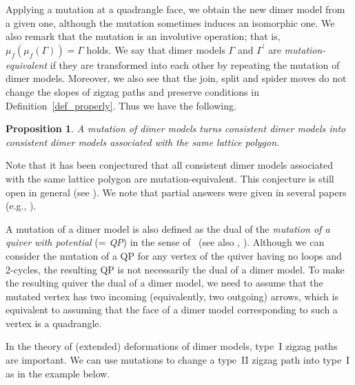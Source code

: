 \documentclass[pdftex]{sigma}%
\numberwithin{equation}{section}
\numberwithin{figure}{section}
\numberwithin{table}{section}
\newtheorem{Proposition}[Theorem]{Proposition}
 { \theoremstyle{definition}
\newtheorem{Definition}[Theorem]{Definition}
\newtheorem{Note}[Theorem]{Note}
\newtheorem{Example}[Theorem]{Example}
\newtheorem{Remark}[Theorem]{Remark}
\newtheorem{observation}[Theorem]{Observation}
\newtheorem{operation}[Theorem]{Operation}
\newtheorem{setting}[Theorem]{Setting}}
\begin{document}
Applying a mutation at a quadrangle face, we obtain the new dimer model from a given one, although the mutation sometimes induces an isomorphic one.
We also remark that the mutation is an involutive operation; that is, $\mu_f(\mu_f(\Gamma))=\Gamma$ holds.
We say that dimer models $\Gamma$ and $\Gamma^\prime$ are \emph{mutation-equivalent} if they are transformed into
each other by repeating the mutation of dimer models.
Moreover, we also see that the join, split and spider moves do not change the slopes of zigzag paths and preserve conditions in Definition~\ref{def_properly}. Thus we have the following.

\begin{Proposition}\label{mutation_preserve_toric}
A mutation of dimer models turns consistent dimer models into consistent dimer models associated with the same lattice polygon.
\end{Proposition}

Note that it has been conjectured that all consistent dimer models associated with the same lattice polygon are mutation-equivalent.
This conjecture is still open in general (see \cite[pp.~396--397]{Boc_abc}).
We note that partial answers were given in several papers (e.g., \cite{Boc_toricNCCR,GK,HS,Nak}).

\begin{Remark}A mutation of a dimer model is also defined as the dual of the \emph{mutation of a quiver with potential} (= \emph{QP}) in the sense of~\cite{DWZ} (see also \cite[Section~7.2]{Boc_toricNCCR}, \cite[Section~4]{Nak}).
Although we can consider the mutation of a QP for any vertex of the quiver having no loops and 2-cycles, the resulting QP is not necessarily the dual of a dimer model.
To make the resulting quiver the dual of a dimer model, we need to assume that the mutated vertex has two incoming (equivalently, two outgoing) arrows, which is equivalent to assuming that the face of a dimer model corresponding to such a vertex is a quadrangle.
\end{Remark}

In the theory of (extended) deformations of dimer models, type~I zigzag paths are important.
We can use mutations to change a type~II zigzag path into type~I as in the example below.
\end{document}
